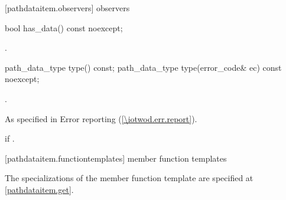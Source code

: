  [pathdataitem.observers] { observers}

\begin{itemdecl}
bool has_data() const noexcept;
\end{itemdecl}
\begin{itemdescr}
\pnum
\returns
{}.
\end{itemdescr}

\begin{itemdecl}
path_data_type type() const;
path_data_type type(error_code& ec) const noexcept;
\end{itemdecl}
\begin{itemdescr}
\pnum
\returns
{}.

\pnum
\throws
As specified in Error reporting (\ref{\iotwod.err.report}).

\pnum
\errors
{} if .
\end{itemdescr}

 [pathdataitem.functiontemplates] { member function templates}

\pnum
The specializations of the  member function template are specified at \ref{pathdataitem.get}.
